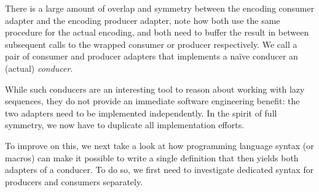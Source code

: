 \documentclass[sigplan,screen,10pt,review]{acmart}
\begin{document}
There is a large amount of overlap and symmetry between the encoding consumer adapter and the encoding producer adapter, note how both use the same procedure for the actual encoding, and both need to buffer the result in between subsequent calls to the wrapped consumer or producer respectively. We call a pair of consumer and producer adapters that implements a naïve conducer an (actual) \textit{conducer}.

While such conducers are an interesting tool to reason about working with lazy sequences, they do not provide an immediate software engineering benefit: the two adapters need to be implemented independently. In the spirit of full symmetry, we now have to duplicate all implementation efforts.

To improve on this, we next take a look at how programming language syntax (or macros) can make it possible to write a single definition that then yields both adapters of a conducer. To do so, we first need to investigate dedicated syntax for producers and consumers separately.




\end{document}
